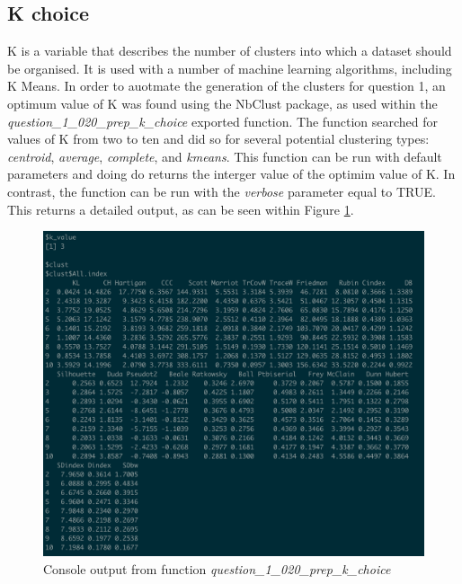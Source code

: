 \documentclass[12pt, oneside, openany]{book}
\begin{document}
\subsection*{K choice}
K is a variable that describes the number of clusters into which a dataset should be organised. It is used with a number of machine learning algorithms, including K Means. In order to auotmate the generation of the clusters for question 1, an optimum value of K was found using the NbClust package, as used within the \emph{question\_1\_020\_prep\_k\_choice} exported function. The function searched for values of K from two to ten and did so for several potential clustering types: \emph{centroid}, \emph{average}, \emph{complete}, and \emph{kmeans}. This function can be run with default parameters and doing do returns the interger value of the optimim value of K. In contrast, the function can be run with the \emph{verbose} parameter equal to TRUE. This returns a detailed output, as can be seen within Figure \ref{fig:question_1_020_prep_k_choice_console_output}.

\begin{figure}
	\centering
	\captionsetup{justification=centering}
	\includegraphics[scale=0.5]{question_1_020_prep_k_choice_console_output}
	\caption{Console output from function \emph{question\_1\_020\_prep\_k\_choice}}
	\label{fig:question_1_020_prep_k_choice_console_output}
\end{figure}
\end{document}
